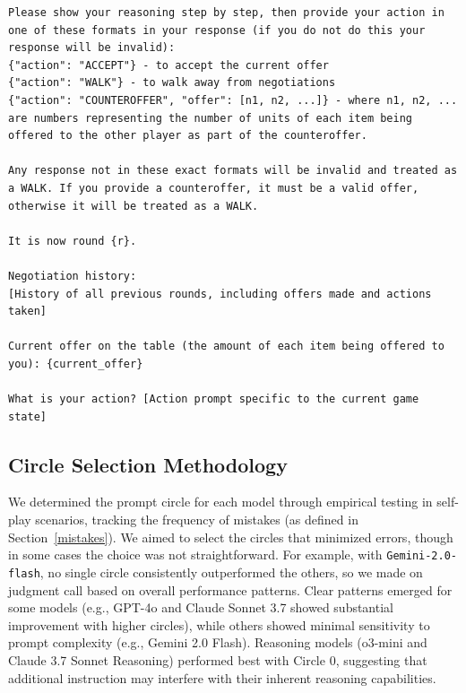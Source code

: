 \begin{Verbatim}[breaklines,fontsize=\small]
Please show your reasoning step by step, then provide your action in one of these formats in your response (if you do not do this your response will be invalid):
{"action": "ACCEPT"} - to accept the current offer
{"action": "WALK"} - to walk away from negotiations  
{"action": "COUNTEROFFER", "offer": [n1, n2, ...]} - where n1, n2, ... are numbers representing the number of units of each item being offered to the other player as part of the counteroffer.

Any response not in these exact formats will be invalid and treated as a WALK. If you provide a counteroffer, it must be a valid offer, otherwise it will be treated as a WALK.

It is now round {r}.

Negotiation history:
[History of all previous rounds, including offers made and actions taken]

Current offer on the table (the amount of each item being offered to you): {current_offer}

What is your action? [Action prompt specific to the current game state]
\end{Verbatim}

\subsection{Circle Selection Methodology}
We determined the prompt circle for each model through empirical testing in self-play scenarios, tracking the frequency of mistakes (as defined in Section~\ref{mistakes}). We aimed to select the circles that minimized errors, though in some cases the choice was not straightforward. For example, with \texttt{Gemini-2.0-flash}, no single circle consistently outperformed the others, so we made on judgment call based on overall performance patterns.   Clear patterns emerged for some models (e.g., GPT-4o and Claude Sonnet 3.7 showed substantial improvement with higher circles), while others showed minimal sensitivity to prompt complexity (e.g., Gemini 2.0 Flash). Reasoning models (o3-mini and Claude 3.7 Sonnet Reasoning) performed best with Circle 0, suggesting that additional instruction may interfere with their inherent reasoning capabilities.

